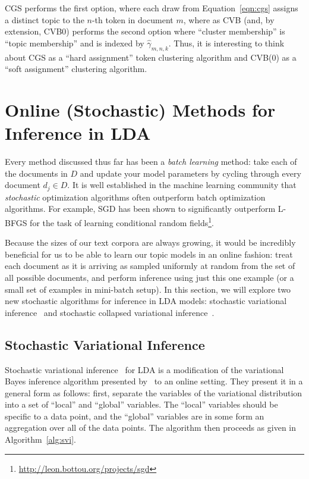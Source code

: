 \documentclass[11pt]{article}
\begin{document}
CGS performs the first option, where each draw from Equation~\ref{eqn:cgs}
assigns a distinct topic to the $n$-th token in document $m$, where as CVB
(and, by extension, CVB0) performs the second option where ``cluster
membership'' is ``topic membership'' and is indexed by
$\hat{\gamma}_{m,n,k}$. Thus, it is interesting to think about CGS as a
``hard assignment'' token clustering algorithm and CVB(0) as a ``soft
assignment'' clustering algorithm.

\section{Online (Stochastic) Methods for Inference in LDA}

Every method discussed thus far has been a \emph{batch learning} method:
take each of the documents in $D$ and update your model parameters by
cycling through every document $d_j \in D$. It is well established in the
machine learning community that \emph{stochastic} optimization algorithms
often outperform batch optimization algorithms. For example, SGD has been
shown to significantly outperform L-BFGS for the task of learning
conditional random
fields\footnote{\url{http://leon.bottou.org/projects/sgd}}.

Because the sizes of our text corpora are always growing, it would be
incredibly beneficial for us to be able to learn our topic models in an
online fashion: treat each document as it is arriving as sampled uniformly
at random from the set of all possible documents, and perform inference
using just this one example (or a small set of examples in mini-batch
setup). In this section, we will explore two new stochastic algorithms for
inference in LDA models: stochastic variational
inference~\cite{Hoffman:2013:svb} and stochastic collapsed variational
inference~\cite{Foulds:2013:scvb}.

\subsection{Stochastic Variational Inference}
Stochastic variational inference~\cite{Hoffman:2013:svb} for LDA is a
modification of the variational Bayes inference algorithm presented
by~\cite{Blei:2003:LDA} to an online setting. They present it in a general
form as follows: first, separate the variables of the variational
distribution into a set of ``local'' and ``global'' variables. The
``local'' variables should be specific to a data point, and the ``global''
variables are in some form an aggregation over all of the data points. The
algorithm then proceeds as given in Algorithm~\ref{alg:svi}.
\end{document}
